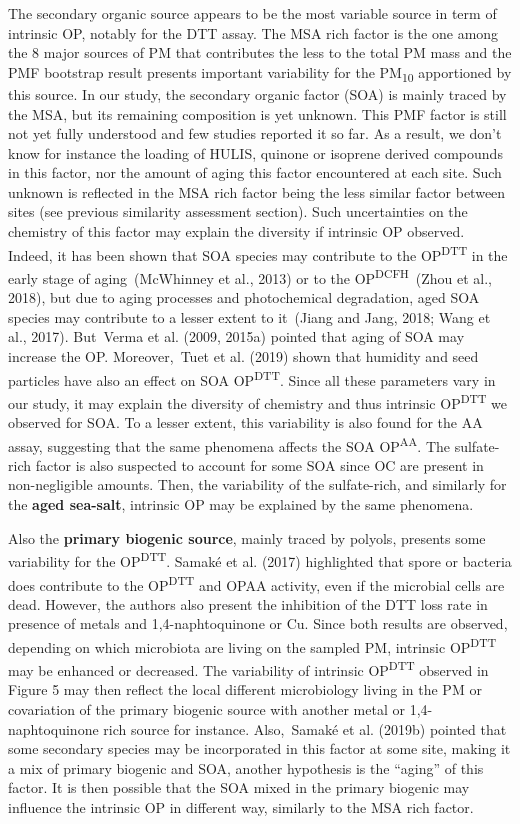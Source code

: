 \documentclass[
]{article}
\begin{document}
The secondary organic source appears to be the most variable source in
term of intrinsic OP, notably for the DTT assay. The MSA rich factor is
the one among the 8 major sources of PM that contributes the less to the
total PM mass and the PMF bootstrap result presents important
variability for the PM\textsubscript{10} apportioned by this source. In
our study, the secondary organic factor (SOA) is mainly traced by the
MSA, but its remaining composition is yet unknown. This PMF factor is
still not yet fully understood and few studies reported it so far. As a
result, we don't know for instance the loading of HULIS, quinone or
isoprene derived compounds in this factor, nor the amount of aging this
factor encountered at each site. Such unknown is reflected in the MSA
rich factor being the less similar factor between sites (see previous
similarity assessment section). Such uncertainties on the chemistry of
this factor may explain the diversity if intrinsic OP observed. Indeed,
it has been shown that SOA species may contribute to the
OP\textsuperscript{DTT} in the early stage of aging~(McWhinney et al.,
2013) or to the OP\textsuperscript{DCFH}~(Zhou et al., 2018), but due to
aging processes and photochemical degradation, aged SOA species may
contribute to a lesser extent to it~(Jiang and Jang, 2018; Wang et al.,
2017). But~Verma et al. (2009, 2015a) pointed that aging of SOA may
increase the OP. Moreover,~Tuet et al. (2019) shown that humidity and
seed particles have also an effect on SOA OP\textsuperscript{DTT}. Since
all these parameters vary in our study, it may explain the diversity of
chemistry and thus intrinsic OP\textsuperscript{DTT} we observed for
SOA. To a lesser extent, this variability is also found for the AA
assay, suggesting that the same phenomena affects the SOA
OP\textsuperscript{AA}. The sulfate-rich factor is also suspected to
account for some SOA since OC are present in non-negligible amounts.
Then, the variability of the sulfate-rich, and similarly for the
\textbf{aged sea-salt}, intrinsic OP may be explained by the same
phenomena.

Also the \textbf{primary biogenic source}, mainly traced by polyols,
presents some variability for the OP\textsuperscript{DTT}. Samaké et al.
(2017) highlighted that spore or bacteria does contribute to the
OP\textsuperscript{DTT} and OPAA activity, even if the microbial cells
are dead. However, the authors also present the inhibition of the DTT
loss rate in presence of metals and 1,4-naphtoquinone or Cu. Since both
results are observed, depending on which microbiota are living on the
sampled PM, intrinsic OP\textsuperscript{DTT} may be enhanced or
decreased. The variability of intrinsic OP\textsuperscript{DTT} observed
in Figure 5 may then reflect the local different microbiology living in
the PM or covariation of the primary biogenic source with another metal
or 1,4-naphtoquinone rich source for instance. Also,~Samaké et al.
(2019b) pointed that some secondary species may be incorporated in this
factor at some site, making it a mix of primary biogenic and SOA,
another hypothesis is the ``aging'' of this factor. It is then possible
that the SOA mixed in the primary biogenic may influence the intrinsic
OP in different way, similarly to the MSA rich factor.
\end{document}
